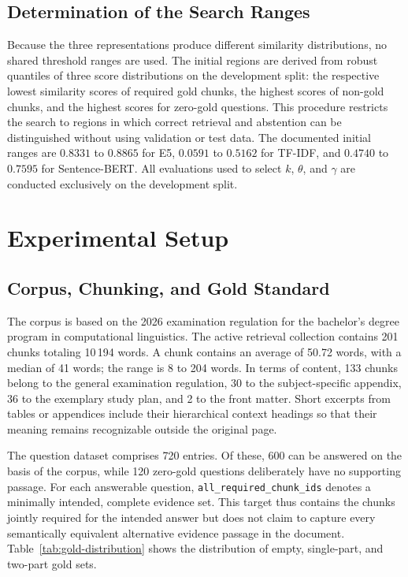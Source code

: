 \documentclass[11pt]{article}
\begin{document}
\subsection{Determination of the Search Ranges}

Because the three representations produce different similarity distributions, no shared threshold ranges are used. The initial regions are derived from robust quantiles of three score distributions on the development split: the respective lowest similarity scores of required gold chunks, the highest scores of non-gold chunks, and the highest scores for zero-gold questions. This procedure restricts the search to regions in which correct retrieval and abstention can be distinguished without using validation or test data. The documented initial ranges are $0.8331$ to $0.8865$ for E5, $0.0591$ to $0.5162$ for TF-IDF, and $0.4740$ to $0.7595$ for Sentence-BERT. All evaluations used to select $k$, $\theta$, and $\gamma$ are conducted exclusively on the development split.


\section{Experimental Setup}

\subsection{Corpus, Chunking, and Gold Standard}

The corpus is based on the 2026 examination regulation for the bachelor's degree program in computational linguistics. The active retrieval collection contains 201 chunks totaling 10{\,}194 words. A chunk contains an average of 50.72 words, with a median of 41 words; the range is 8 to 204 words. In terms of content, 133 chunks belong to the general examination regulation, 30 to the subject-specific appendix, 36 to the exemplary study plan, and 2 to the front matter. Short excerpts from tables or appendices include their hierarchical context headings so that their meaning remains recognizable outside the original page.

The question dataset comprises 720 entries. Of these, 600 can be answered on the basis of the corpus, while 120 zero-gold questions deliberately have no supporting passage. For each answerable question, \texttt{all\_required\_chunk\_ids} denotes a minimally intended, complete evidence set. This target thus contains the chunks jointly required for the intended answer but does not claim to capture every semantically equivalent alternative evidence passage in the document. Table~\ref{tab:gold-distribution} shows the distribution of empty, single-part, and two-part gold sets.
\end{document}
